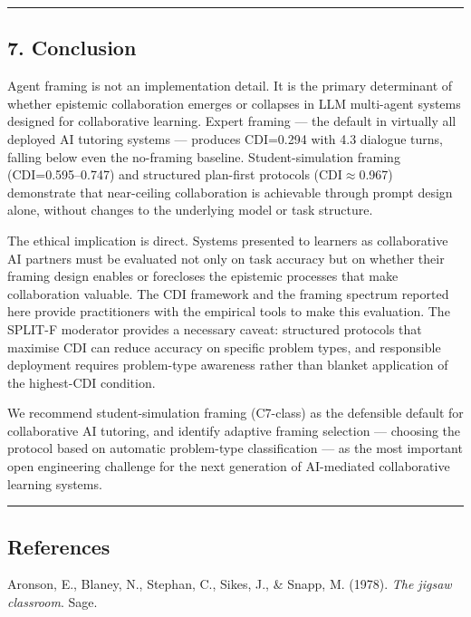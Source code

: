 \documentclass[
  11pt,
]{article}
\begin{document}
\begin{center}\rule{0.5\linewidth}{0.5pt}\end{center}

\subsection{7. Conclusion}\label{conclusion}

Agent framing is not an implementation detail. It is the primary
determinant of whether epistemic collaboration emerges or collapses in
LLM multi-agent systems designed for collaborative learning. Expert
framing --- the default in virtually all deployed AI tutoring systems ---
produces CDI=0.294 with 4.3 dialogue turns, falling below even the
no-framing baseline. Student-simulation framing (CDI=0.595--0.747) and
structured plan-first protocols (CDI$\approx$0.967) demonstrate that
near-ceiling collaboration is achievable through prompt design alone,
without changes to the underlying model or task structure.

The ethical implication is direct. Systems presented to learners as
collaborative AI partners must be evaluated not only on task accuracy but
on whether their framing design enables or forecloses the epistemic
processes that make collaboration valuable. The CDI framework and the
framing spectrum reported here provide practitioners with the empirical
tools to make this evaluation. The SPLIT-F moderator provides a necessary
caveat: structured protocols that maximise CDI can reduce accuracy on
specific problem types, and responsible deployment requires problem-type
awareness rather than blanket application of the highest-CDI condition.

We recommend student-simulation framing (C7-class) as the defensible
default for collaborative AI tutoring, and identify adaptive framing
selection --- choosing the protocol based on automatic problem-type
classification --- as the most important open engineering challenge for
the next generation of AI-mediated collaborative learning systems.

\begin{center}\rule{0.5\linewidth}{0.5pt}\end{center}

\subsection{References}\label{references}

Aronson, E., Blaney, N., Stephan, C., Sikes, J., \& Snapp, M. (1978). \emph{The jigsaw classroom}. Sage.
\end{document}
